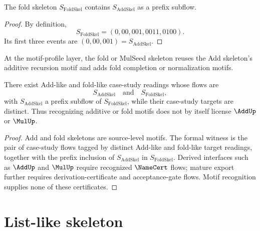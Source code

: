 \begin{proposition}
\label{prop:case-studies-fold-extends-add}
The fold skeleton $S_{\mathrm{FoldSkel}}$ contains $S_{\mathrm{AddSkel}}$ as a prefix subflow.
\end{proposition}

\begin{proof}
By definition,
$$
  S_{\mathrm{FoldSkel}}=(0,00,001,0011,0100).
$$
Its first three events are $(0,00,001)=S_{\mathrm{AddSkel}}$.
\end{proof}

\begin{corollary}
\label{cor:case-studies-fold-reuses-add}
At the motif-profile layer, the fold or MulSeed skeleton reuses the Add skeleton's additive recursion motif and adds fold completion or normalization motifs.
\end{corollary}

\begin{theorem}
\label{thm:case-studies-add-fold-not-license}
There exist Add-like and fold-like case-study readings whose flows are
$$
  S_{\mathrm{AddSkel}}
  \quad\text{and}\quad
  S_{\mathrm{FoldSkel}},
$$
with $S_{\mathrm{AddSkel}}$ a prefix subflow of $S_{\mathrm{FoldSkel}}$, while their case-study targets are distinct. Thus recognizing additive or fold motifs does not by itself license $\AddUp$ or $\MulUp$.
\end{theorem}

\begin{proof}
Add and fold skeletons are source-level motifs. The formal witness is the pair of case-study flows tagged by distinct Add-like and fold-like target readings, together with the prefix inclusion of $S_{\mathrm{AddSkel}}$ in $S_{\mathrm{FoldSkel}}$. Derived interfaces such as $\AddUp$ and $\MulUp$ require recognized $\NameCert$ flows; mature export further requires derivation-certificate and acceptance-gate flows. Motif recognition supplies none of these certificates.
\end{proof}

\section{List-like skeleton}
\label{sec:case-studies-list-like}

